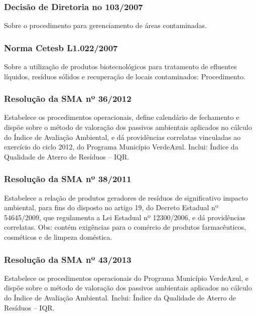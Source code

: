 \begin{subapend}
\begin{subsubapend}
		\subsubsection{Decisão de Diretoria no 103/2007}
		Sobre o procedimento para gerenciamento de áreas contaminadas.
		\subsubsection{Norma Cetesb L1.022/2007}
		Sobre a utilização de produtos biotecnológicos para tratamento de efluentes líquidos, resíduos sólidos e recuperação de locais contaminados: Procedimento.
		\subsubsection{Resolução da SMA nº 36/2012}
		Estabelece os procedimentos operacionais, define calendário de fechamento e dispõe sobre o método de valoração dos passivos ambientais aplicados no cálculo do Índice de Avaliação Ambiental, e dá providências correlatas vinculadas ao exercício do ciclo 2012, do Programa Município VerdeAzul. Inclui: Índice da Qualidade de Aterro de Resíduos – IQR.
		\subsubsection{Resolução da SMA nº 38/2011}
		Estabelece a relação de produtos geradores de resíduos de significativo impacto ambiental, para fins do disposto no artigo 19, do Decreto Estadual nº 54645/2009, que regulamenta a Lei Estadual nº 12300/2006, e dá providências correlatas. Obs: contém exigências para o comércio de produtos farmacêuticos, cosméticos e de limpeza doméstica.
		\subsubsection{Resolução da SMA nº 43/2013}
		Estabelece os procedimentos operacionais do Programa Município VerdeAzul, e dispõe sobre o método de valoração dos passivos ambientais aplicados no cálculo do Índice de Avaliação Ambiental. Inclui: Índice da Qualidade de Aterro de Resíduos – IQR.
	\end{subsubapend}
\end{subapend}

